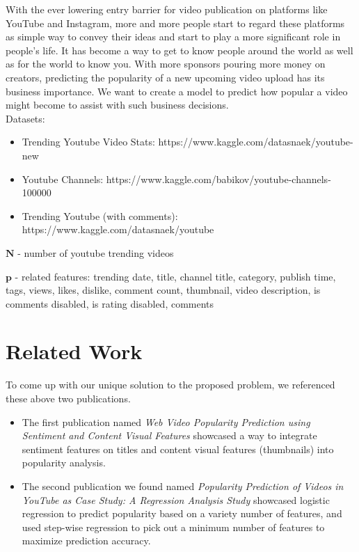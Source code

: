 \documentclass[english]{article}
\begin{document}
With the ever lowering entry barrier for video publication on platforms like YouTube and Instagram, more and more people start to regard these platforms as simple way to convey their ideas and start to play a more significant role in people’s life. It has become a way to get to know people around the world as well as for the world to know you. With more sponsors pouring more money on creators, predicting the popularity of a new upcoming video upload has its business importance. We want to create a model to predict how popular a video might become to assist with such business decisions.\\
Datasets:
\begin{itemize}
\item Trending Youtube Video Stats: https://www.kaggle.com/datasnaek/youtube-new
\item Youtube Channels: https://www.kaggle.com/babikov/youtube-channels-100000
\item Trending Youtube (with comments): https://www.kaggle.com/datasnaek/youtube
\end{itemize}
\item $\textbf{N}$ - number of youtube trending videos
\item $\textbf{p}$ - related features: trending date, title, channel title, category, publish time, tags, views, likes, dislike, comment count, thumbnail, video description, is comments disabled, is rating disabled, comments

\section{Related Work}

To come up with our unique solution to the proposed problem, we referenced these above two publications. 
\begin{itemize}
    \item The first publication named \textit{Web Video Popularity Prediction using Sentiment and Content Visual Features} \cite{vp1} showcased a way to integrate sentiment features on titles and content visual features (thumbnails) into popularity analysis.
    \item The second publication we found named \textit{Popularity Prediction of Videos in YouTube as Case Study: A Regression Analysis Study} \cite{vp2} showcased logistic regression to predict popularity based on a variety number of features, and used step-wise regression to pick out a minimum number of features to maximize prediction accuracy.
\end{itemize}
\end{document}
